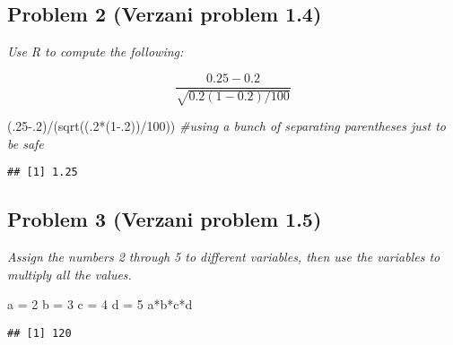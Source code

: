 \documentclass[
]{article}
\newenvironment{Shaded}{\begin{snugshade}}{\end{snugshade}}
\newcommand{\CommentTok}[1]{\textcolor[rgb]{0.56,0.35,0.01}{\textit{#1}}}
\newcommand{\DecValTok}[1]{\textcolor[rgb]{0.00,0.00,0.81}{#1}}
\newcommand{\FloatTok}[1]{\textcolor[rgb]{0.00,0.00,0.81}{#1}}
\newcommand{\FunctionTok}[1]{\textcolor[rgb]{0.00,0.00,0.00}{#1}}
\newcommand{\NormalTok}[1]{#1}
\newcommand{\OtherTok}[1]{\textcolor[rgb]{0.56,0.35,0.01}{#1}}
\newcommand{\SpecialCharTok}[1]{\textcolor[rgb]{0.00,0.00,0.00}{#1}}
\begin{document}
\hypertarget{problem-2-verzani-problem-1.4}{%
\subsection{Problem 2 (Verzani problem
1.4)}\label{problem-2-verzani-problem-1.4}}

\emph{Use R to compute the following:}

\[\frac{0.25 - 0.2}{\sqrt{0.2(1-0.2)/100}}\]

\begin{Shaded}
\begin{Highlighting}[]
\NormalTok{(.}\DecValTok{25}\FloatTok{{-}.2}\NormalTok{)}\SpecialCharTok{/}\NormalTok{(}\FunctionTok{sqrt}\NormalTok{((.}\DecValTok{2}\SpecialCharTok{*}\NormalTok{(}\DecValTok{1}\FloatTok{{-}.2}\NormalTok{))}\SpecialCharTok{/}\DecValTok{100}\NormalTok{)) }\CommentTok{\#using a bunch of separating parentheses just to be safe}
\end{Highlighting}
\end{Shaded}

\begin{verbatim}
## [1] 1.25
\end{verbatim}

\hypertarget{problem-3-verzani-problem-1.5}{%
\subsection{Problem 3 (Verzani problem
1.5)}\label{problem-3-verzani-problem-1.5}}

\emph{Assign the numbers 2 through 5 to different variables, then use
the variables to multiply all the values.}

\begin{Shaded}
\begin{Highlighting}[]
\NormalTok{a }\OtherTok{=} \DecValTok{2}
\NormalTok{b }\OtherTok{=} \DecValTok{3}
\NormalTok{c }\OtherTok{=} \DecValTok{4}
\NormalTok{d }\OtherTok{=} \DecValTok{5}
\NormalTok{a}\SpecialCharTok{*}\NormalTok{b}\SpecialCharTok{*}\NormalTok{c}\SpecialCharTok{*}\NormalTok{d}
\end{Highlighting}
\end{Shaded}

\begin{verbatim}
## [1] 120
\end{verbatim}
\end{document}
